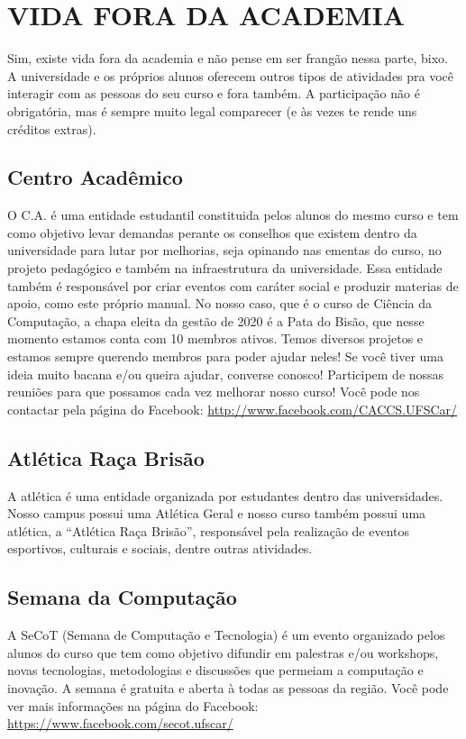\section{VIDA FORA DA ACADEMIA}
Sim, existe vida fora da academia e não pense em ser frangão nessa parte, bixo. A universidade e os próprios alunos oferecem outros tipos de atividades pra você interagir com as pessoas do seu curso e fora também. A participação não é obrigatória, mas é sempre muito legal comparecer (e às vezes te rende uns créditos extras).

\subsection{Centro Acadêmico}
O C.A. é uma entidade estudantil constituida pelos alunos do mesmo curso e tem como objetivo levar demandas perante os conselhos que existem dentro da universidade para lutar por melhorias, seja opinando nas ementas do curso, no projeto pedagógico e também na infraestrutura da universidade. Essa entidade também é responsável por criar eventos com caráter social e produzir materias de apoio, como este próprio manual. No nosso caso, que é o curso de Ciência da Computação, a chapa eleita da gestão de 2020 é a Pata do Bisão, que nesse momento estamos conta com 10 membros ativos. Temos diversos projetos e estamos sempre querendo membros para poder ajudar neles! Se você tiver uma ideia muito bacana e/ou queira ajudar, converse conosco! Participem de nossas reuniões para que possamos cada vez melhorar nosso curso! Você pode nos contactar pela página do Facebook: \newline \url{http://www.facebook.com/CACCS.UFSCar/}

\subsection{Atlética Raça Brisão}
A atlética é uma entidade organizada por estudantes dentro das universidades. Nosso campus possui uma Atlética Geral e nosso curso também possui uma atlética, a “Atlética Raça Brisão”, responsável pela realização de eventos esportivos, culturais e sociais, dentre outras atividades.

\subsection{Semana da Computação}
A SeCoT (Semana de Computação e Tecnologia) é um evento organizado pelos alunos do curso que tem como objetivo difundir em palestras e/ou workshops, novas tecnologias, metodologias e discussões que permeiam a computação e inovação. A semana é gratuita e aberta à todas as pessoas da região. Você pode ver mais informações na página do Facebook: \newline \url{https://www.facebook.com/secot.ufscar/}

